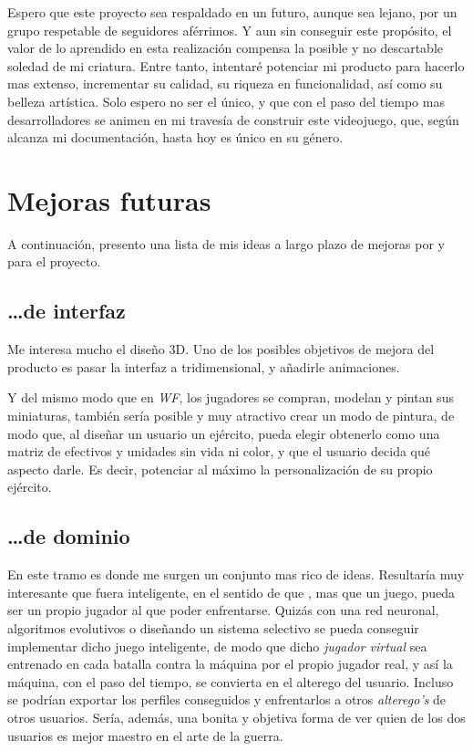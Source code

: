 Espero que este proyecto sea respaldado en un futuro, aunque sea
lejano, por un grupo respetable de seguidores aférrimos. Y aun sin
conseguir este propósito, el valor de lo aprendido en esta realización
compensa la posible y no descartable soledad de mi criatura. Entre
tanto, intentaré potenciar mi producto para hacerlo mas extenso,
incrementar su calidad, su riqueza en funcionalidad, así como su
belleza artística. Solo espero no ser el único, y que con el paso del tiempo mas
desarrolladores se animen en mi travesía de construir este videojuego,
que, según alcanza mi documentación, hasta hoy es único en su género.

\section{Mejoras futuras}
\label{sec:mejoras}

A continuación, presento una lista de mis ideas a largo plazo de mejoras por y para el proyecto.

\subsection{\ldots de interfaz}
Me interesa mucho el diseño 3D. Uno de los posibles objetivos de
mejora del producto es pasar la interfaz a tridimensional, y añadirle
animaciones.

Y del mismo modo que en \textit{WF}, los jugadores se compran, modelan
y pintan sus miniaturas, también sería posible y muy atractivo crear
un modo de pintura, de modo que, al diseñar un usuario un ejército,
pueda elegir obtenerlo como una matriz de efectivos y unidades sin
vida ni color, y que el usuario decida qué aspecto darle. Es decir,
potenciar al máximo la personalización de su propio ejército. 

\subsection{\ldots de dominio}
En este tramo es donde me surgen un conjunto mas rico de
ideas. Resultaría muy interesante que \gom fuera inteligente, en el
sentido de que \gomf, mas que un juego, pueda ser un propio jugador al
que poder enfrentarse. Quizás con una red neuronal, algoritmos
evolutivos o diseñando un sistema selectivo se pueda conseguir
implementar dicho juego inteligente, de modo que dicho
\textit{jugador virtual} sea entrenado en cada batalla contra la
máquina por el propio jugador real, y así la máquina, con el paso del
tiempo, se convierta en el alterego del usuario. Incluso se podrían
exportar los perfiles conseguidos y enfrentarlos a otros
\textit{alterego's} de otros usuarios. Sería, además, una bonita y
objetiva forma de ver quien de los dos usuarios es mejor maestro en el
arte de la guerra.

